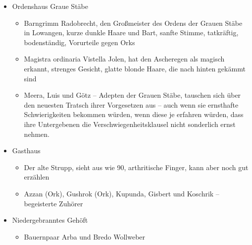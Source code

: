 \begin{itemize}
\begin{itemize}
    \end{itemize}
    \item Ordenshaus Graue Stäbe
                \begin{itemize}
        	\item  Barngrimm Radobrecht, den Großmeister des Ordens der Grauen Stäbe in Lowangen, kurze dunkle Haare und Bart, sanfte Stimme, tatkräftig, bodenständig, Vorurteile gegen Orks
      \item  Magistra ordinaria Vistella Jolen, hat den Ascheregen als magisch erkannt, strenges Gesicht, glatte blonde Haare, die nach hinten gekämmt sind
        \item Meera, Luis und Götz -- Adepten der Grauen Stäbe, tauschen sich über den neuesten Tratsch ihrer Vorgesetzen aus -- auch wenn sie ernsthafte Schwierigkeiten bekommen würden, wenn diese je erfahren würden, dass ihre Untergebenen die Verschwiegenheitsklausel nicht sonderlich ernst nehmen.
        \end{itemize}
        \end{itemize}

  \begin{itemize}
  	\item Gasthaus
                \begin{itemize}
        	\item  Der alte Strupp, sieht aus wie 90, arthritische Finger, kann aber noch gut erzählen
        \item Azzan (Ork), Gushrok (Ork), Kupunda, Gisbert und Koschrik -- begeisterte Zuhörer
        \end{itemize}
    \item Niedergebranntes Gehöft
                \begin{itemize}
        	\item Bauernpaar Arba und Bredo Wollweber
        	\end{itemize}
\end{itemize}

